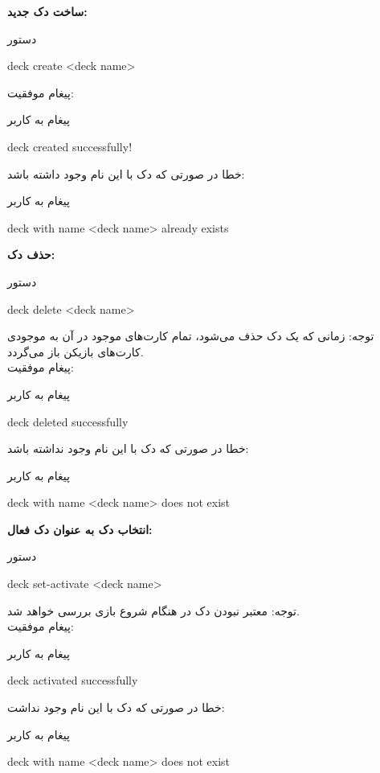 \documentclass[]{article}
\begin{document}
\vspace{.5cm}
\textbf{ساخت دک جدید:}
\begin{mybox}[colback=yellow]{دستور}
	\begin{latin}	
		deck create <deck name>
	\end{latin}
\end{mybox}

پیغام موفقیت:
\begin{mybox}[colback=yellow]{پیغام به کاربر}
	\begin{latin}	
		deck created successfully!
	\end{latin}
\end{mybox}
خطا در صورتی که دک با این نام وجود داشته باشد:
\begin{mybox}[colback=yellow]{پیغام به کاربر}
	\begin{latin}	
		deck with name <deck name> already exists
	\end{latin}
\end{mybox}

\vspace{.5cm}
\textbf{حذف دک:}
\begin{mybox}[colback=yellow]{دستور}
	\begin{latin}	
		deck delete <deck name>
	\end{latin}
\end{mybox}
توجه: زمانی که یک دک حذف می‌شود، تمام کارت‌های موجود در آن به موجودی کارت‌های 
بازیکن باز می‌گردد.
\\
پیغام موفقیت:
\begin{mybox}[colback=yellow]{پیغام به کاربر}
	\begin{latin}	
		deck deleted successfully
	\end{latin}
\end{mybox}
خطا در صورتی که دک با این نام وجود نداشته باشد:
\begin{mybox}[colback=yellow]{پیغام به کاربر}
	\begin{latin}	
		deck with name <deck name> does not exist
	\end{latin}
\end{mybox}

\vspace{.5cm}
\textbf{انتخاب دک به عنوان دک فعال:}
\begin{mybox}[colback=yellow]{دستور}
	\begin{latin}	
		deck set-activate <deck name>
	\end{latin}
\end{mybox}
توجه: معتبر نبودن دک در هنگام شروع بازی بررسی خواهد شد.
\\
پیغام موفقیت:
\begin{mybox}[colback=yellow]{پیغام به کاربر}
	\begin{latin}	
		deck activated successfully
	\end{latin}
\end{mybox}
خطا در صورتی که دک با این نام وجود نداشت:
\begin{mybox}[colback=yellow]{پیغام به کاربر}
	\begin{latin}	
		deck with name <deck name> does not exist
	\end{latin}
\end{mybox}
\end{document}
